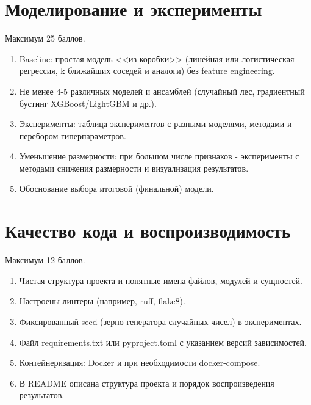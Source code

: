\section{Моделирование и эксперименты}
\label{sec:crit:modeling}

Максимум 25 баллов.

\begin{enumerate}
  \item Baseline: простая модель <<из коробки>> (линейная или логистическая
  регрессия, k ближайших соседей и аналоги) без feature engineering.
  \label{crit:model:baseline}

  \item Не менее 4-5 различных моделей и ансамблей (случайный лес,
  градиентный бустинг XGBoost/LightGBM и др.).
  \label{crit:model:variety}

  \item Эксперименты: таблица экспериментов с разными моделями, методами и
  перебором гиперпараметров.
  \label{crit:model:experiments}

  \item Уменьшение размерности: при большом числе признаков - эксперименты
  с методами снижения размерности и визуализация результатов.
  \label{crit:model:dimred}

  \item Обоснование выбора итоговой (финальной) модели.
  \label{crit:model:final}
\end{enumerate}

\section{Качество кода и воспроизводимость}
\label{sec:crit:code}

Максимум 12 баллов.

\begin{enumerate}
  \item Чистая структура проекта и понятные имена файлов, модулей и
  сущностей.
  \label{crit:code:structure}

  \item Настроены линтеры (например, ruff, flake8).
  \label{crit:code:linters}

  \item Фиксированный seed (зерно генератора случайных чисел) в
  экспериментах.
  \label{crit:code:seed}

  \item Файл requirements.txt или pyproject.toml с указанием версий зависимостей.
  \label{crit:code:deps}

  \item Контейнеризация: Docker и при необходимости docker-compose.
  \label{crit:code:docker}

  \item В README описана структура проекта и порядок воспроизведения
  результатов.
  \label{crit:code:readme}
\end{enumerate}

